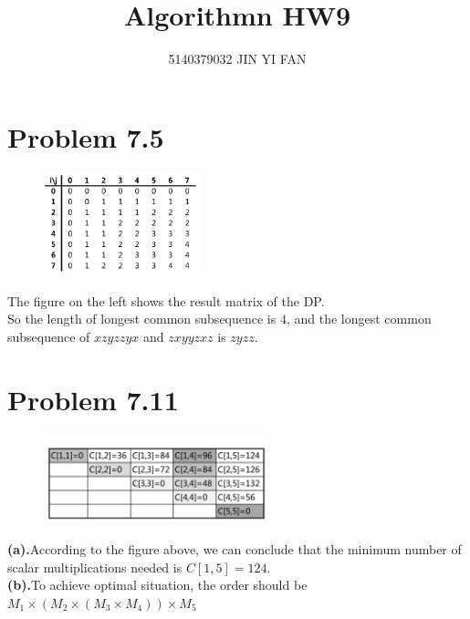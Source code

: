 \documentclass[a4paper]{article}
\title{\textbf{Algorithmn HW9}}
\author{5140379032 JIN YI FAN}
\date{}
\begin{document}
\maketitle
\begin{spacing}{1.3}
\begin{multicols}{2}
\section*{Problem 7.5}
\begin{figure}[H]
    \centering
    \includegraphics[width=4.5cm]{LCS.png}
\end{figure}
The figure on the left shows the result matrix of the DP.
\\So the length of longest common subsequence is $4$, and the longest common subsequence of $xzyzzyx$ and $zxyyzxz$ is $zyzz$.

\section*{Problem 7.11}
\begin{figure}[H]
    \centering
    \includegraphics[width=6.5cm]{matrix.png}
\end{figure}
\textbf{(a).}According to the figure above, we can conclude that the minimum number of scalar multiplications needed is $C[1,5]=124$.
\\\textbf{(b).}To achieve optimal situation, the order should be $M_1\times (M_2\times (M_3\times M_4))\times M_5$
\end{multicols}


\end{spacing}
\end{document}
